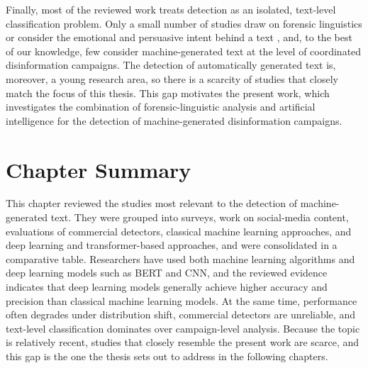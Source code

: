 Finally, most of the reviewed work treats detection as an isolated, text-level classification problem. Only a small number of studies draw on forensic linguistics \cite{sousasilva2024} or consider the emotional and persuasive intent behind a text \cite{adithya2025}, and, to the best of our knowledge, few consider machine-generated text at the level of coordinated disinformation campaigns. The detection of automatically generated text is, moreover, a young research area, so there is a scarcity of studies that closely match the focus of this thesis. This gap motivates the present work, which investigates the combination of forensic-linguistic analysis and artificial intelligence for the detection of machine-generated disinformation campaigns.

\section{Chapter Summary}
\label{sec:lr_summary}

This chapter reviewed the studies most relevant to the detection of machine-generated text. They were grouped into surveys, work on social-media content, evaluations of commercial detectors, classical machine learning approaches, and deep learning and transformer-based approaches, and were consolidated in a comparative table. Researchers have used both machine learning algorithms and deep learning models such as BERT and CNN, and the reviewed evidence indicates that deep learning models generally achieve higher accuracy and precision than classical machine learning models. At the same time, performance often degrades under distribution shift, commercial detectors are unreliable, and text-level classification dominates over campaign-level analysis. Because the topic is relatively recent, studies that closely resemble the present work are scarce, and this gap is the one the thesis sets out to address in the following chapters.
